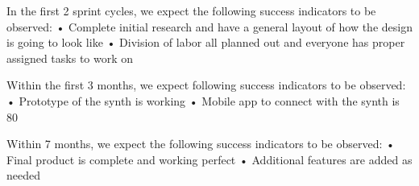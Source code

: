 In the first 2 sprint cycles, we expect the following success indicators to be observed:
•	Complete initial research and have a general layout of how the design is going to look like
•	Division of labor all planned out and everyone has proper assigned tasks to work on

Within the first 3 months, we expect following success indicators to be observed:
•	Prototype of the synth is working
•	Mobile app to connect with the synth is 80%

Within 7 months, we expect the following success indicators to be observed:
•	Final product is complete and working perfect
•	Additional features are added as needed
